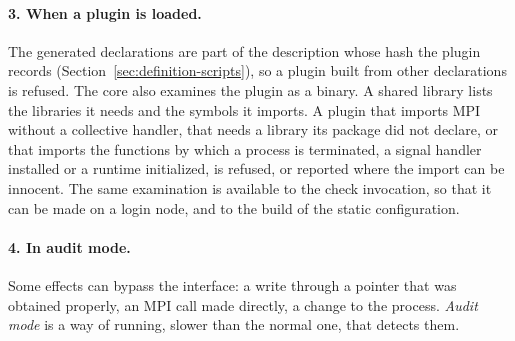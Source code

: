 \documentclass[11pt,a4paper]{article}
\begin{document}
\paragraph{3. When a plugin is loaded.}  The generated declarations are part
of the description whose hash the plugin records
(Section~\ref{sec:definition-scripts}), so a plugin built from other
declarations is refused.  The core also examines the plugin as a binary.  A
shared library lists the libraries it needs and the symbols it imports.  A
plugin that imports MPI without a collective handler, that needs a library
its package did not declare, or that imports the functions by which a
process is terminated, a signal handler installed or a runtime initialized,
is refused, or reported where the import can be innocent.  The same
examination is available to the check invocation, so that it can be made on
a login node, and to the build of the static configuration.

\paragraph{4. In audit mode.}  Some effects can bypass the interface: a write
through a pointer that was obtained properly, an MPI call made directly, a
change to the process.  \emph{Audit mode} is a way of running, slower than
the normal one, that detects them.
\end{document}
